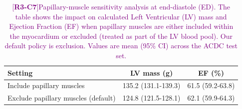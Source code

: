 \documentclass[fleqn,10pt]{wlscirep}
\newcommand{\revtag}[2]{[\textbf{R#1-C#2}]}
\newcommand{\Rthree}[1]{\textcolor{purple}{#1}}
\begin{document}
\begin{table}[!htbp]
  \caption{\Rthree{\revtag{3}{7}Papillary-muscle sensitivity analysis at end-diastole (ED). The table shows the impact on calculated Left Ventricular (LV) mass and Ejection Fraction (EF) when papillary muscles are either included within the myocardium or excluded (treated as part of the LV blood pool). Our default policy is exclusion. Values are mean (95\% CI) across the ACDC test set.}}
  \label{tab:papillary_sensitivity}
  \centering
  \begin{tabular}{lcc}
    \toprule
    Setting & LV mass (g) & EF (\%) \\
    \midrule
    Include papillary muscles & 135.2 (131.1-139.3) & 61.5 (59.2-63.8) \\
    Exclude papillary muscles (default) & 124.8 (121.5-128.1) & 62.1 (59.9-64.3) \\
    \bottomrule
  \end{tabular}
\end{table}
\end{document}
